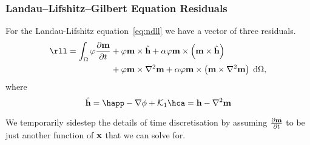 

\subsubsection{Landau--Lifshitz--Gilbert Equation Residuals}


For the Landau-Lifshitz equation~\eqref{eq:ndll} we have a vector of three residuals.
\begin{equation}
  \begin{aligned}
    \rll = \int_\magd \tbf \dmdt &+ \tbf \mv \times \hat{\hv}
    + \dampc \tbf \mv \times \left( \mv \times \hat{\hv} \right) \\
    &+  \tbf \mv \times \lap \mv
    + \dampc \tbf \mv \times \left(\mv \times \lap \mv\right) \d\magd,
    \label{res:contllg}
  \end{aligned}
\end{equation}
where
\begin{equation}
  \hat{\hv} = \happ - \nabla \phi + \kone \hca = \hv - \lap \mv
\end{equation}

We temporarily sidestep the details of time discretisation by assuming $\frac{\partial \mathbf{m}}{\partial t}$ to be just another function of $\mathbf{x}$ that we can solve for.


